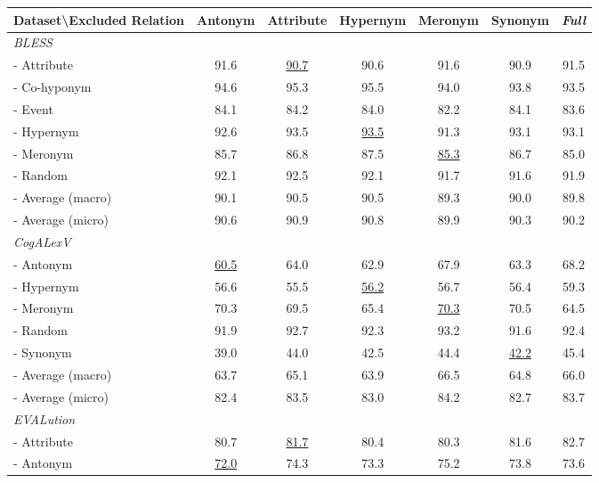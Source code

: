 \documentclass[3p]{elsarticle}
\begin{document}
{\begin{table}[!t]
\centering
\begin{tabular}{lcccccc}
\toprule
Dataset\textbackslash Excluded Relation  & Antonym  & Attribute  & Hypernym  & Meronym  & Synonym  &  \emph{Full} \\
\midrule
\emph{BLESS} &&&&&&\\
- Attribute  &     91.6 &       \underline{90.7} &      90.6 &     91.6 &     90.9 &  91.5 \\
- Co-hyponym &     94.6 &       95.3 &      95.5 &     94.0 &     93.8 &  93.5 \\
- Event      &     84.1 &       84.2 &      84.0 &     82.2 &     84.1 &  83.6 \\
- Hypernym   &     92.6 &       93.5 &      \underline{93.5} &     91.3 &     93.1 &  93.1 \\
- Meronym    &     85.7 &       86.8 &      87.5 &     \underline{85.3} &     86.7 &  85.0 \\
- Random     &     92.1 &       92.5 &      92.1 &     91.7 &     91.6 &  91.9 \\
- Average (macro)   &     90.1 &       90.5 &      90.5 &     89.3 &     90.0 &  89.8 \\
- Average (micro)   &     90.6 &       90.9 &      90.8 &     89.9 &     90.3 &  90.2 \\
\midrule
\emph{CogALexV} &&&&&& \\
- Antonym  &     \underline{60.5} &       64.0 &      62.9 &     67.9 &     63.3 &  68.2 \\
- Hypernym &     56.6 &       55.5 &      \underline{56.2} &     56.7 &     56.4 &  59.3 \\
- Meronym  &     70.3 &       69.5 &      65.4 &     \underline{70.3} &     70.5 &  64.5 \\
- Random   &     91.9 &       92.7 &      92.3 &     93.2 &     91.6 &  92.4 \\
- Synonym  &     39.0 &       44.0 &      42.5 &     44.4 &     \underline{42.2} &  45.4 \\
- Average (macro) &     63.7 &       65.1 &      63.9 &     66.5 &     64.8 &  66.0 \\
- Average (micro) &     82.4 &       83.5 &      83.0 &     84.2 &     82.7 &  83.7 \\
\midrule
\emph{EVALution} &&&&&&\\
- Attribute  &     80.7 &       \underline{81.7} &      80.4 &     80.3 &     81.6 &  82.7 \\
- Antonym    &     \underline{72.0} &       74.3 &      73.3 &     75.2 &     73.8 &  73.6 \\

\end{tabular}
\end{table}}
\end{document}
